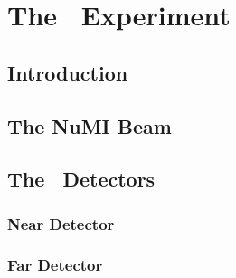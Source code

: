 \chapter{The \nova~Experiment}
\label{ch:nova}

\section{Introduction}

\section{The NuMI Beam}

\section{The \nova~Detectors}

\subsection{Near Detector}

\subsection{Far Detector}